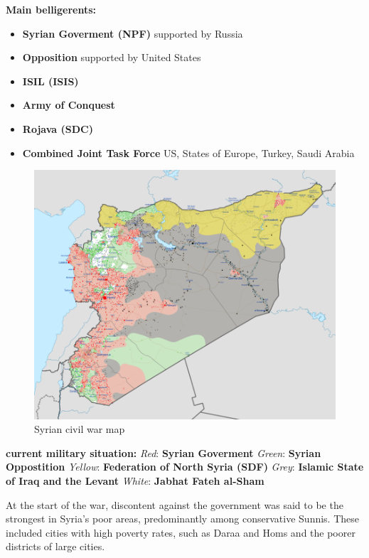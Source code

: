 \textbf{Main belligerents: }
\begin{itemize}
	\item \textbf{Syrian Goverment (NPF)}
		\subitem supported by Russia
	\item \textbf{Opposition}
		\subitem supported by United States
	\item \textbf{ISIL (ISIS)}
	\item \textbf{Army of Conquest}
	\item \textbf{Rojava (SDC)}
	\item \textbf{Combined Joint Task Force}
		\subitem US, States of Europe, Turkey, Saudi Arabia
\end{itemize}

\newpage

\begin{figure}[!h]
	\begin{center}
		\includegraphics[width=\linewidth]{images/Syrian_Civil_War_map}
		\caption{Syrian civil war map}
	\end{center}
\end{figure}

\textbf{current military situation:}\newline
\textit{Red}: \textbf{Syrian Goverment}
\textit{Green}: \textbf{Syrian Oppostition}
\textit{Yellow}: \textbf{Federation of North Syria (SDF)}
\textit{Grey}: \textbf{Islamic State of Iraq and the Levant}
\textit{White}: \textbf{Jabhat Fateh al-Sham}

\newpage

At the start of the war, discontent against the government was said to be the strongest in Syria's poor areas, predominantly among conservative Sunnis. These included cities with high poverty rates, such as Daraa and Homs and the poorer districts of large cities.

